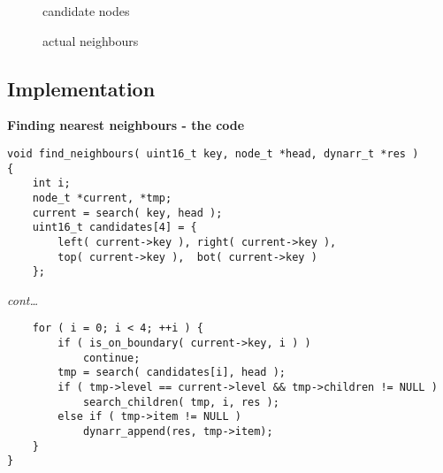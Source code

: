 \begin{frame}
    \begin{figure}
        \centering
        \caption{candidate nodes}
    \end{figure}
    \begin{figure}
        \centering
        \caption{actual neighbours}
    \end{figure}
\end{frame}

\subsection{Implementation}
\begin{frame}[fragile]
    \textbf{Finding nearest neighbours - the code}
    \begin{verbatim}
void find_neighbours( uint16_t key, node_t *head, dynarr_t *res )
{
    int i;
    node_t *current, *tmp;
    current = search( key, head );
    uint16_t candidates[4] = {
        left( current->key ), right( current->key ),
        top( current->key ),  bot( current->key )
    };
    \end{verbatim}
\end{frame}

\begin{frame}[fragile]
    \textit{cont\dots}
    \begin{verbatim}
    for ( i = 0; i < 4; ++i ) {
        if ( is_on_boundary( current->key, i ) )
            continue;
        tmp = search( candidates[i], head );
        if ( tmp->level == current->level && tmp->children != NULL )
            search_children( tmp, i, res );
        else if ( tmp->item != NULL )
            dynarr_append(res, tmp->item);
    }
}
    \end{verbatim}
\end{frame}

